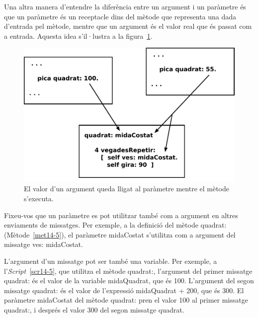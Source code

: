 Una altra manera d'entendre la diferència entre un argument i un paràmetre és que un paràmetre és un receptacle dins del mètode que representa una dada d'entrada pel mètode, mentre que un argument és el valor real que és passat com a entrada. Aquesta idea s'il·lustra a la figura~\ref{fig1403}.
\begin{figure}[h]
\begin{center}
\includegraphics[scale=0.7]{Imatges/figura14-3.pdf}
\end{center}
\caption{El valor d'un argument queda lligat al paràmetre mentre el mètode s'executa.}
\label{fig1403}
\end{figure}

Fixeu-vos que un paràmetre es pot utilitzar també com a argument en altres enviaments de missatges. Per exemple, a la definició del mètode \textsf{quadrat:} (Mètode~\ref{met14-5}), el paràmetre \textsf{midaCostat} s'utilitza com a argument del missatge \textsf{ves: midaCostat}.

L'argument d'un missatge pot ser també una variable. Per exemple, a l'\emph{Script}~\ref{scr14-5}, que utilitza el mètode \textsf{quadrat:}, l'argument del primer missatge \textsf{quadrat:} és el valor de la variable \textsf{midaQuadrat}, que és \textsf{100}. L'argument del segon missatge \textsf{quadrat:} és el valor de l'expressió \textsf{midaQuadrat + 200}, que és \textsf{300}. El paràmetre \textsf{midaCostat} del mètode \textsf{quadrat:} pren el valor \textsf{100} al primer missatge \textsf{quadrat:}, i després el valor \textsf{300} del segon missatge \textsf{quadrat}. 

